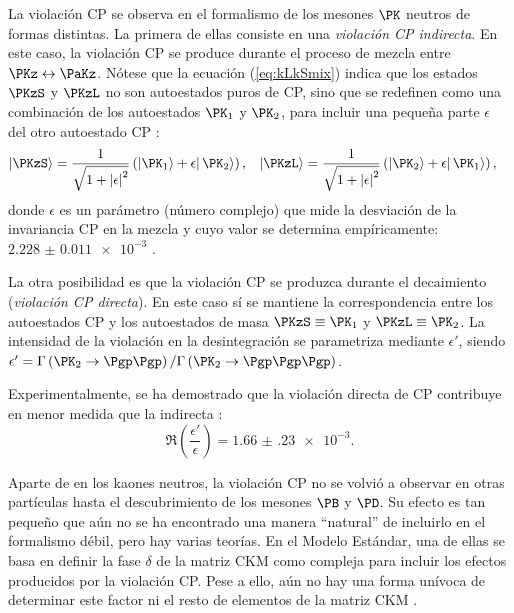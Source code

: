 La violación CP se observa en el formalismo de los mesones $\PK$ neutros de formas distintas. La primera de ellas consiste en una \textit{violación CP indirecta}. En este caso, la violación CP se produce durante el proceso de mezcla entre $\PKz \leftrightarrow \PaKz$. Nótese que la ecuación (\ref{eq:kLkSmix}) indica que los estados $\PKzS$ y $\PKzL$ no son autoestados puros de CP\protect\footnotemark , sino que se redefinen como una combinación de los autoestados $\PK_{1}$ y $\PK_{2}$, para incluir una pequeña parte $\epsilon$ del otro autoestado CP \cite{Thomson}:
\begin{align}
|\PKzS\rangle &= \dfrac{1}{\sqrt{1+\left| \epsilon\right| ^{2}}}\left( \left| \PK_{1}\rangle +\epsilon \right| \PK_{2}\rangle \right), &
|\PKzL\rangle &= \dfrac{1}{\sqrt{1+\left| \epsilon\right| ^{2}}}\left( \left| \PK_{2}\rangle +\epsilon \right| \PK_{1}\rangle \right),\label{eq:kLkSmix}
\end{align}
donde $\epsilon$ es un parámetro (número complejo) que mide la desviación de la invariancia CP en la mezcla y cuyo valor se determina empíricamente: $\num{2.228(11)e-3}$ \cite{Zyla}.


La otra posibilidad es que la violación CP se produzca durante el decaimiento (\textit{violación CP directa}). En este caso sí se mantiene la correspondencia entre los autoestados CP y los autoestados de masa $\PKzS \equiv \PK_{1}$ y $\PKzL \equiv \PK_{2}$. La intensidad de la violación en la desintegración se parametriza mediante $\epsilon '$, siendo $\epsilon '=\Gamma\left(\PK_{2}\rightarrow \Pgp\Pgp \right) / \Gamma\left(\PK_{2}\rightarrow \Pgp\Pgp\Pgp \right)$. 

Experimentalmente, se ha demostrado que la violación directa de CP contribuye en menor medida que la indirecta \cite{Thomson}:
\begin{equation}
\Re\left(\dfrac{\epsilon '}{\epsilon}\right)=\num{1.66(23)e-3}.
\end{equation}

Aparte de en los kaones neutros, la violación CP no se volvió a observar en otras partículas hasta el descubrimiento de los mesones $\PB$ y $\PD$. Su efecto es tan pequeño que aún no se ha encontrado una manera ``natural'' de incluirlo en el formalismo débil, pero hay varias teorías. En el Modelo Estándar, una de ellas se basa en definir la fase $\delta$ de la matriz CKM como compleja para incluir los efectos producidos por la violación CP. Pese a ello, aún no hay una forma unívoca de determinar este factor ni el resto de elementos de la matriz CKM \cite{Griffiths2008}.

